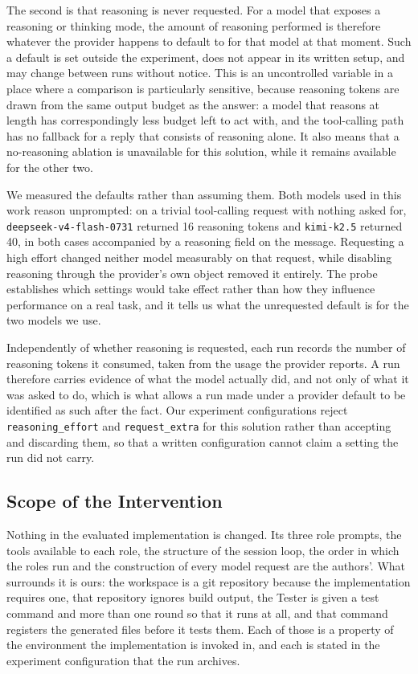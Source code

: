 The second is that reasoning is never requested. For a model that exposes a
reasoning or thinking mode, the amount of reasoning performed is therefore
whatever the provider happens to default to for that model at that moment. Such
a default is set outside the experiment, does not appear in its written setup,
and may change between runs without notice. This is an uncontrolled variable in
a place where a comparison is particularly sensitive, because reasoning tokens
are drawn from the same output budget as the answer: a model that reasons at
length has correspondingly less budget left to act with, and the tool-calling
path has no fallback for a reply that consists of reasoning alone. It also
means that a no-reasoning ablation is unavailable for this solution, while it
remains available for the other two.

We measured the defaults rather than assuming them. Both models used in this
work reason unprompted: on a trivial tool-calling request with nothing asked
for, \texttt{deepseek-v4-flash-0731} returned 16 reasoning tokens and
\texttt{kimi-k2.5} returned 40, in both cases accompanied by a reasoning field
on the message. Requesting a high effort changed neither model measurably on
that request, while disabling reasoning through the provider's own object
removed it entirely. The probe establishes which settings would take effect
rather than how they influence performance on a real task, and it tells us what
the unrequested default is for the two models we use.

Independently of whether reasoning is requested, each run records the number of
reasoning tokens it consumed, taken from the usage the provider reports. A run
therefore carries evidence of what the model actually did, and not only of what
it was asked to do, which is what allows a run made under a provider default to
be identified as such after the fact. Our experiment configurations reject
\texttt{reasoning\_effort} and \texttt{request\_extra} for this solution rather
than accepting and discarding them, so that a written configuration cannot
claim a setting the run did not carry.

\subsection{Scope of the Intervention}

Nothing in the evaluated implementation is changed. Its three role prompts, the
tools available to each role, the structure of the session loop, the order in
which the roles run and the construction of every model request are the
authors'. What surrounds it is ours: the workspace is a git repository because
the implementation requires one, that repository ignores build output, the
Tester is given a test command and more than one round so that it runs at all,
and that command registers the generated files before it tests them. Each of
those is a property of the environment the implementation is invoked in, and
each is stated in the experiment configuration that the run archives.

